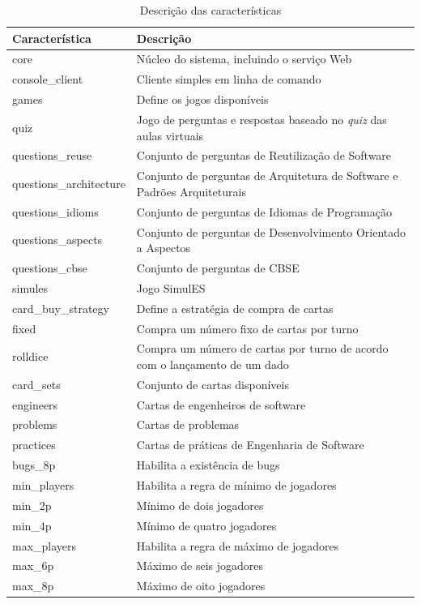 \documentclass[12pt]{article}
\newcommand{\tra}[1]{\renewcommand{\arraystretch}{#1}}
\begin{document}
\begin{table}[htb]\centering
\footnotesize
\tra{1.1}
\begin{tabular}{@{}ll@{}}\toprule
\textbf{Característica} & \textbf{Descrição} \\
\midrule
core & Núcleo do sistema, incluindo o serviço Web \\
console\_client & Cliente simples em linha de comando \\
games & Define os jogos disponíveis\\
quiz & Jogo de perguntas e respostas baseado no \emph{quiz} das aulas virtuais\\
questions\_reuse & Conjunto de perguntas de Reutilização de Software\\
questions\_architecture & Conjunto de perguntas de Arquitetura de Software e Padrões Arquiteturais\\
questions\_idioms & Conjunto de perguntas de Idiomas de Programação\\
questions\_aspects & Conjunto de perguntas de Desenvolvimento Orientado a Aspectos\\
questions\_cbse & Conjunto de perguntas de CBSE\\
simules & Jogo SimulES\\
card\_buy\_strategy & Define a estratégia de compra de cartas\\
fixed & Compra um número fixo de cartas por turno\\
rolldice & Compra um número de cartas por turno de acordo com o lançamento de um dado\\
card\_sets & Conjunto de cartas disponíveis\\
engineers & Cartas de engenheiros de software\\
problems & Cartas de problemas\\
practices & Cartas de práticas de Engenharia de Software\\
bugs\_8p & Habilita a existência de bugs\\
min\_players & Habilita a regra de mínimo de jogadores\\
min\_2p & Mínimo de dois jogadores\\
min\_4p & Mínimo de quatro jogadores\\
max\_players & Habilita a regra de máximo de jogadores\\
max\_6p & Máximo de seis jogadores\\
max\_8p & Máximo de oito jogadores\\
\bottomrule
\end{tabular}
\caption{Descrição das características}
\label{tab:features}
\end{table}
\end{document}
